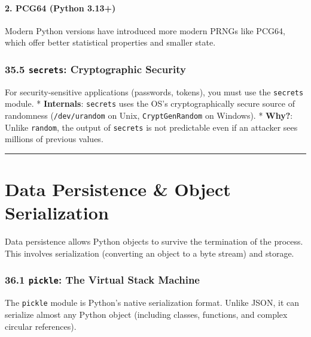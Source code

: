 \hypertarget{pcg64-python-3.13}{%
\subsubsection{2. PCG64 (Python 3.13+)}\label{pcg64-python-3.13}}

Modern Python versions have introduced more modern PRNGs like PCG64,
which offer better statistical properties and smaller state.

\hypertarget{secrets-cryptographic-security}{%
\subsection{\texorpdfstring{35.5 \texttt{secrets}: Cryptographic
Security}{35.5 secrets: Cryptographic Security}}\label{secrets-cryptographic-security}}

For security-sensitive applications (passwords, tokens), you must use
the \passthrough{\lstinline!secrets!} module. * \textbf{Internals}:
\passthrough{\lstinline!secrets!} uses the OS's cryptographically secure
source of randomness (\passthrough{\lstinline!/dev/urandom!} on Unix,
\passthrough{\lstinline!CryptGenRandom!} on Windows). * \textbf{Why?}:
Unlike \passthrough{\lstinline!random!}, the output of
\passthrough{\lstinline!secrets!} is not predictable even if an attacker
sees millions of previous values.

\begin{center}\rule{0.5\linewidth}{0.5pt}\end{center}

\hypertarget{data-persistence-object-serialization}{%
\chapter{Data Persistence \& Object
Serialization}\label{data-persistence-object-serialization}}

Data persistence allows Python objects to survive the termination of the
process. This involves serialization (converting an object to a byte
stream) and storage.

\hypertarget{pickle-the-virtual-stack-machine}{%
\subsection{\texorpdfstring{36.1 \texttt{pickle}: The Virtual Stack
Machine}{36.1 pickle: The Virtual Stack Machine}}\label{pickle-the-virtual-stack-machine}}

The \passthrough{\lstinline!pickle!} module is Python's native
serialization format. Unlike JSON, it can serialize almost any Python
object (including classes, functions, and complex circular references).


